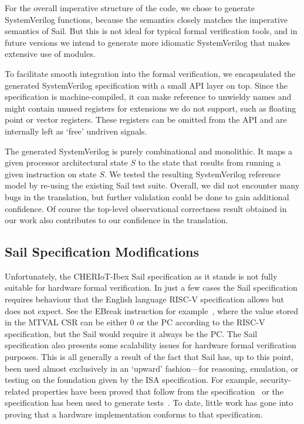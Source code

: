 \documentclass[10pt,conference]{IEEEtran}
\begin{document}
For the overall imperative structure of the code, we chose to generate
SystemVerilog functions, because the semantics closely matches the
imperative semantics of Sail.  But this is not ideal for typical formal
verification tools, and in future versions we intend to generate more
idiomatic SystemVerilog that makes extensive use of modules.

To facilitate smooth integration into the formal verification, we
encapsulated the generated SystemVerilog specification with a small API
layer on top. Since the specification is machine-compiled, it can make
reference to unwieldy names and might contain unused registers for
extensions we do not support, such as floating point or vector
registers. These registers can be omitted from the API and are internally
left as `free' undriven signals.

The generated SystemVerilog is purely combinational and monolithic. It maps
a given processor architectural state $S$ to the state that results from
running a given instruction on state $S$. We tested the resulting
SystemVerilog reference model by re-using the existing Sail test
suite. Overall, we did not encounter many bugs in the translation, but
further validation could be done to gain additional confidence. Of course
the top-level observational correctness result obtained in our work also
contributes to our confidence in the translation.

\subsection{Sail Specification Modifications}

Unfortunately, the CHERIoT-Ibex Sail specification as it stands is not
fully suitable for hardware formal verification. In just a few cases the
Sail specification requires behaviour that the English language RISC-V
specification allows but does not expect. See the EBreak instruction for
example~\cite{ebreak-english,ebreak-sail}, where the value stored in
the MTVAL CSR can be either 0 or the PC according to the RISC-V specification,
but the Sail would require it always be the PC.  The Sail specification also
presents some scalability issues for hardware formal verification purposes. This is all
generally a result of the fact that Sail has, up to this point, been used
almost exclusively in an `upward' fashion---for reasoning, emulation, or
testing on the foundation given by the ISA specification. For example,
security-related properties have been proved that follow from the
specification~\cite{cheriot-sail-properties} or the specification has been
used to generate tests~\cite{Sail}. To date, little work has gone into
proving that a hardware implementation conforms to that specification.
\end{document}
